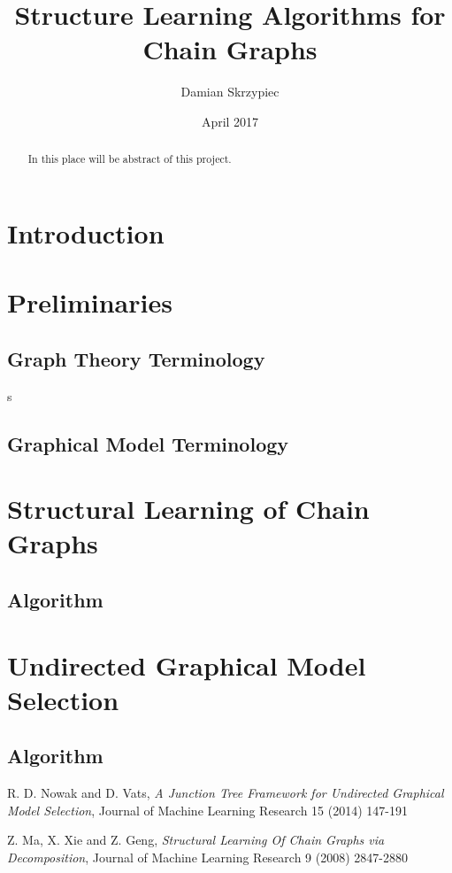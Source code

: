 \documentclass{pracamgr}
\author{Damian Skrzypiec}
\title{Structure Learning Algorithms for Chain Graphs}
\date{April 2017}
\begin{document}
\maketitle

\begin{abstract}
  In this place will be abstract of this project.
\end{abstract}

\tableofcontents

\chapter{Introduction}




\chapter{Preliminaries}\label{r:prelim}

	\section{Graph Theory Terminology}\label{r:defGraph}s
		
		
	\section{Graphical Model Terminology}\label{r:defGraphModel}
		


\chapter{Structural Learning of Chain Graphs}

	\section{Algorithm}


\chapter{Undirected Graphical Model Selection}
	
	\section{Algorithm}


\begin{thebibliography}{99}
	 R. D. Nowak and D. Vats, \textit{A Junction Tree Framework for Undirected Graphical Model Selection}, Journal of Machine Learning Research 15 (2014) 147-191
	
	 Z. Ma, X. Xie and Z. Geng, \textit{Structural Learning Of Chain Graphs via Decomposition}, Journal of Machine Learning Research 9 (2008) 2847-2880
	
\end{thebibliography}
\end{document}
